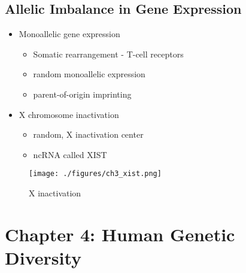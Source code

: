 \documentclass{scrartcl}
\begin{document}
\subsection{Allelic Imbalance in Gene Expression}
\label{sec:orgc53fd44}
\begin{itemize}
\item Monoallelic gene expression
\begin{itemize}
\item Somatic rearrangement - T-cell receptors
\item random monoallelic expression
\item parent-of-origin imprinting
\end{itemize}
\item X chromosome inactivation
\begin{itemize}
\item random, X inactivation center
\item ncRNA called XIST
\end{itemize}
\end{itemize}

\begin{figure}[htbp]
\centering
\texttt{[image: ./figures/ch3\_xist.png]}
\caption{\label{fig:orgb273277}
X inactivation}
\end{figure}

\section{Chapter 4: Human Genetic Diversity}
\label{sec:orgdaca0e7}
\end{document}

